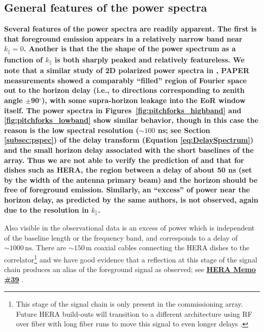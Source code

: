 \documentclass[twocolumn, trackchanges]{aastex61}
\newcommand{\edited}[1]{{\bf \color{red} #1}}
\begin{document}
\clearpage

\subsection{General features of the power spectra}
\label{subsec:general_features}

\edited{
Several features of the power spectra are readily apparent.  The first is that foreground emission appears in a relatively	 narrow band near $k_\parallel = 0$.  Another is that the the shape of the power spectrum as a function of $k_\parallel$ is both sharply peaked and relatively featureless.  We note that a similar study of 2D polarized power spectra in \citet{Kohn16}, PAPER measurements showed a comparably ``filled'' region of Fourier space out to the horizon delay (i.e., to directions corresponding to zenith angle $\pm$90$^{\circ}$), with some supra-horizon leakage \citep[e.g.,][]{Pober13} into the EoR window itself. The power spectra in Figures~\ref{fig:pitchforks_highband} and \ref{fig:pitchforks_lowband} show similar behavior, though in this case the reason is the low spectral resolution ($\sim100$ ns; see Section \ref{subsec:pspec}) of the delay transform (Equation \ref{eq:DelaySpectrum}) and the small horizon delay associated with the short baselines of the array.   Thus we are not able to verify the prediction of \citet{Nithya.15b} and \citet{Neben.16} that for dishes such as HERA, the region between a delay of about 50 ns (set by the width of the antenna primary beam) and the horizon should be free of foreground emission.  Similarly, an ``excess'' of power near the horizon delay, as predicted by the same authors,
is not observed, again due to the resolution in $k_\parallel$.  

Also visible in the observational data is an excess of power which is independent of the baseline length or the frequency band, and corresponds to a delay of $\sim1000 \, \mathrm{ns}$.  There are $\sim 150 \, \mathrm{m}$ coaxial cables connecting the HERA dishes to the correlator\footnote{This stage of the signal chain is only present in the commissioning array. Future HERA build-outs will transition to a different architecture using RF over fiber with long fiber runs to move this signal to even longer delays \citep{deBoer17}.} and we have good evidence that a reflection at this stage of the signal chain produces an alias of the foreground signal as observed; see \href{http://reionization.org/wp-content/uploads/2013/03/HERA39_H1C_cable_reflections_ewall-wice.pdf}{\edited{\underline{HERA Memo \#39}}} \citep{hera_memo39}.

}
\end{document}
